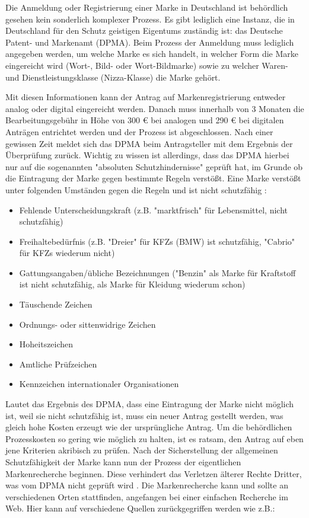 Die Anmeldung oder Registrierung einer Marke in Deutschland ist behördlich gesehen kein sonderlich komplexer Prozess. Es gibt lediglich eine Instanz, die in Deutschland für den Schutz geistigen Eigentums zuständig ist: das Deutsche Patent- und Markenamt (DPMA). Beim Prozess der Anmeldung muss lediglich angegeben werden, um welche Marke es sich handelt, in welcher Form die Marke eingereicht wird (Wort-, Bild- oder Wort-Bildmarke) sowie zu welcher Waren- und Dienstleistungsklasse (Nizza-Klasse) die Marke gehört. 

Mit diesen Informationen kann der Antrag auf Markenregistrierung entweder analog oder digital eingereicht werden. Danach muss innerhalb von 3 Monaten die Bearbeitungsgebühr in Höhe von 300 € bei analogen und 290 € bei digitalen Anträgen entrichtet werden und der Prozess ist abgeschlossen. Nach einer gewissen Zeit meldet sich das DPMA beim Antragsteller mit dem Ergebnis der Überprüfung zurück. Wichtig zu wissen ist allerdings, dass das DPMA hierbei nur auf die sogenannten "absoluten Schutzhindernisse" geprüft hat, im Grunde ob die Eintragung der Marke gegen bestimmte Regeln verstößt. Eine Marke verstößt unter folgenden Umständen gegen die Regeln und ist nicht schutzfähig : 

\begin{itemize}
    \item Fehlende Unterscheidungskraft (z.B. "marktfrisch" für Lebensmittel, nicht schutzfähig)
    \item Freihaltebedürfnis (z.B. "Dreier" für KFZs (BMW) ist schutzfähig, "Cabrio" für KFZs wiederum nicht)
    \item Gattungsangaben/übliche Bezeichnungen ("Benzin" als Marke für Kraftstoff ist nicht schutzfähig, als Marke für Kleidung wiederum schon)
    \item Täuschende Zeichen
    \item Ordnungs- oder sittenwidrige Zeichen
    \item Hoheitszeichen
    \item Amtliche Prüfzeichen
    \item Kennzeichen internationaler Organisationen
\end{itemize}

Lautet das Ergebnis des DPMA, dass eine Eintragung der Marke nicht möglich ist, weil sie nicht schutzfähig ist, muss ein neuer Antrag gestellt werden, was gleich hohe Kosten erzeugt wie der ursprüngliche Antrag. Um die behördlichen Prozesskosten so gering wie möglich zu halten, ist es ratsam, den Antrag auf eben jene Kriterien akribisch zu prüfen. Nach der Sicherstellung der allgemeinen Schutzfähigkeit der Marke kann nun der Prozess der eigentlichen Markenrecherche beginnen. Diese verhindert das Verletzen älterer Rechte Dritter, was vom DPMA nicht geprüft wird . Die Markenrecherche kann und sollte an verschiedenen Orten stattfinden, angefangen bei einer einfachen Recherche im Web. Hier kann auf verschiedene Quellen zurückgegriffen werden wie z.B.:

